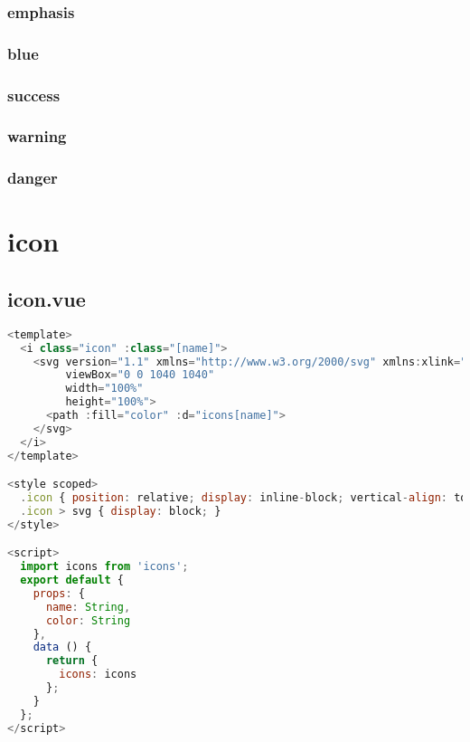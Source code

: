 \subsection{emphasis}


\subsection{blue}


\subsection{success}




\subsection{warning}



\subsection{danger}

\chapter{icon}


\section{icon.vue}


\begin{lstlisting}[language=JavaScript]
<template>
  <i class="icon" :class="[name]">
    <svg version="1.1" xmlns="http://www.w3.org/2000/svg" xmlns:xlink="http://www.w3.org/1999/xlink"
         viewBox="0 0 1040 1040"
         width="100%"
         height="100%">
      <path :fill="color" :d="icons[name]">
    </svg>
  </i>
</template>

<style scoped>
  .icon { position: relative; display: inline-block; vertical-align: top; width: 20px; height: 20px; overflow: hidden; }
  .icon > svg { display: block; }
</style>

<script>
  import icons from 'icons';
  export default {
    props: {
      name: String,
      color: String
    },
    data () {
      return {
        icons: icons
      };
    }
  };
</script>
\end{lstlisting}






